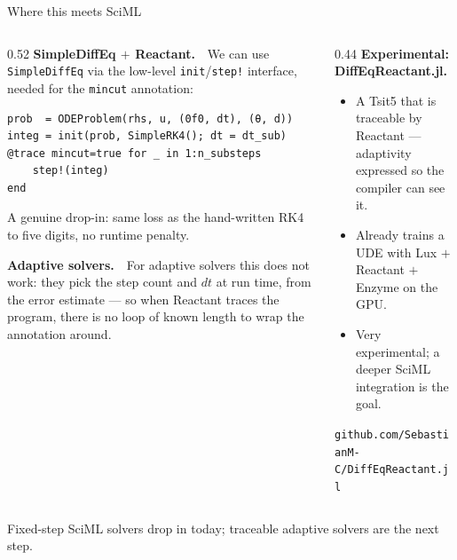 \documentclass[aspectratio=169]{beamer}
\newcommand{\smallcode}{\ttfamily\fontsize{6.6}{7.9}\selectfont}
\begin{document}
\begin{frame}[fragile]{Where this meets SciML}
  \small
  \begin{columns}[t]
  \begin{column}{0.52\textwidth}
    \textbf{SimpleDiffEq $+$ Reactant.}\ \
    We can use \texttt{SimpleDiffEq} via the low-level \texttt{init}/\texttt{step!}
    interface, needed for the \texttt{mincut} annotation:
\begin{lstlisting}[basicstyle=\smallcode]
prob  = ODEProblem(rhs, u, (0f0, dt), (θ, d))
integ = init(prob, SimpleRK4(); dt = dt_sub)
@trace mincut=true for _ in 1:n_substeps
    step!(integ)
end
\end{lstlisting}
    {\footnotesize A genuine drop-in: same loss as the hand-written RK4 to five digits,
    no runtime penalty.}

    \vspace{0.5em}
    \textbf{Adaptive solvers.}\ \
    For adaptive solvers this does not work: they pick the step count and $dt$ at run time,
    from the error estimate --- so when Reactant traces the program, there is no loop of
    known length to wrap the annotation around.
  \end{column}
  \begin{column}{0.44\textwidth}
    \textbf{Experimental: DiffEqReactant.jl.}
    \begin{itemize}\setlength{\itemsep}{0.3em}
      \item {\small A Tsit5 that is traceable by Reactant --- adaptivity expressed so the
            compiler can see it.}
      \item {\small Already trains a UDE with Lux $+$ Reactant $+$ Enzyme on the GPU.}
      \item {\small Very experimental; a deeper SciML integration is the goal.}
    \end{itemize}

    \vspace{0.5em}
    {\scriptsize \texttt{github.com/SebastianM-C/DiffEqReactant.jl}}
  \end{column}
  \end{columns}

  \vspace{0.5em}
  \alert{Fixed-step SciML solvers drop in today; traceable adaptive solvers are the next step.}
\end{frame}
\end{document}
